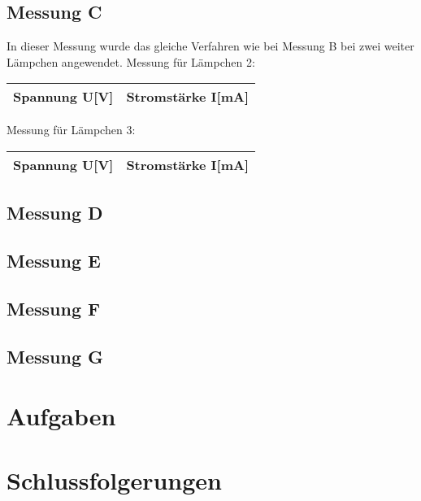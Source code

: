 \documentclass[12pt, a4paper, twoside]{article}
\begin{document}
    \subsection{Messung C}
    In dieser Messung wurde das gleiche Verfahren wie bei Messung B bei zwei weiter Lämpchen angewendet.
    Messung für Lämpchen 2:\\
    \begin{center}
        \begin{tabular}{l|r}
            \textbf{Spannung U[V]} & \textbf{Stromstärke I[mA]}\\
            \hline
            
        \end{tabular}
    \end{center}
    Messung für Lämpchen 3:\\
    \begin{center}
        \begin{tabular}{l|r}
            \textbf{Spannung U[V]} & \textbf{Stromstärke I[mA]}\\
            \hline
        \end{tabular}
    \end{center}
    \subsection{Messung D}

    \subsection{Messung E}
    \subsection{Messung F}
    \subsection{Messung G}
    \newpage
    \section{Aufgaben}
    \newpage
    \section{Schlussfolgerungen}
    \newpage
\end{document}
